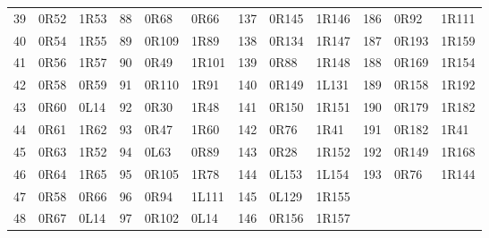 \begin{center}
\begin{tabular}{rll@{\hspace{1.2em}}rll@{\hspace{1.2em}}rll@{\hspace{1.2em}}rll}
39 & 0R52 & 1R53 & 88 & 0R68 & 0R66 & 137 & 0R145 & 1R146 & 186 & 0R92 & 1R111\\
40 & 0R54 & 1R55 & 89 & 0R109 & 1R89 & 138 & 0R134 & 1R147 & 187 & 0R193 & 1R159\\
41 & 0R56 & 1R57 & 90 & 0R49 & 1R101 & 139 & 0R88 & 1R148 & 188 & 0R169 & 1R154\\
42 & 0R58 & 0R59 & 91 & 0R110 & 1R91 & 140 & 0R149 & 1L131 & 189 & 0R158 & 1R192\\
43 & 0R60 & 0L14 & 92 & 0R30 & 1R48 & 141 & 0R150 & 1R151 & 190 & 0R179 & 1R182\\
44 & 0R61 & 1R62 & 93 & 0R47 & 1R60 & 142 & 0R76 & 1R41 & 191 & 0R182 & 1R41\\
45 & 0R63 & 1R52 & 94 & 0L63 & 0R89 & 143 & 0R28 & 1R152 & 192 & 0R149 & 1R168\\
46 & 0R64 & 1R65 & 95 & 0R105 & 1R78 & 144 & 0L153 & 1L154 & 193 & 0R76 & 1R144\\
47 & 0R58 & 0R66 & 96 & 0R94 & 1L111 & 145 & 0L129 & 1R155 &  & & \\
48 & 0R67 & 0L14 & 97 & 0R102 & 0L14 & 146 & 0R156 & 1R157 &  & & \\
\bottomrule\end{tabular}
\endgroup\end{center}
\clearpage
